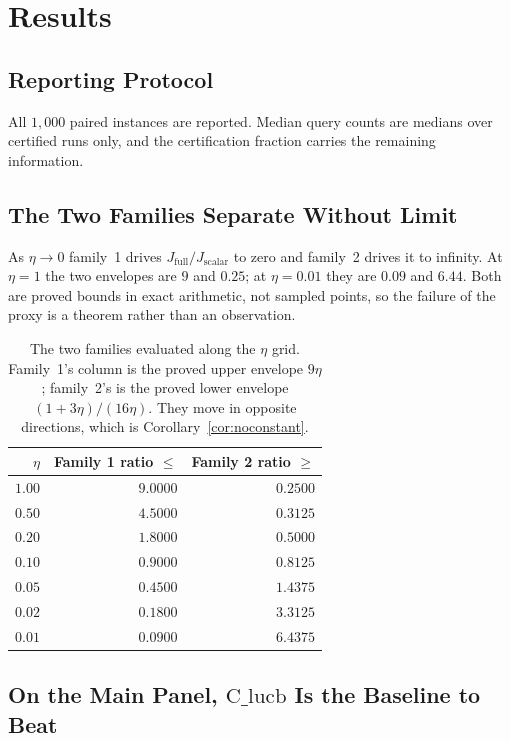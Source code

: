 \section{Results}
\label{sec:results}

\subsection{Reporting Protocol}

All $1{,}000$ paired instances are reported. Median query counts are medians over certified
runs only, and the certification fraction carries the remaining information.

\subsection{The Two Families Separate Without Limit}

As $\eta\to0$ family~1 drives $J_{\mathrm{full}}/J_{\mathrm{scalar}}$ to zero and family~2
drives it to infinity. At $\eta=1$ the two envelopes are $9$ and $0.25$; at $\eta=0.01$ they
are $0.09$ and $6.44$. Both are proved bounds in exact arithmetic, not sampled points, so the
failure of the proxy is a theorem rather than an observation.

\begin{table}[htbp]
\caption{The two families evaluated along the $\eta$ grid. Family~1's column is the proved
upper envelope $9\eta$; family~2's is the proved lower envelope $(1+3\eta)/(16\eta)$. They
move in opposite directions, which is Corollary~\ref{cor:noconstant}.}
\label{tab:families}
\centering
\footnotesize
\begin{tabular}{@{}rrr@{}}
\toprule
$\eta$ & Family 1 ratio $\le$ & Family 2 ratio $\ge$ \\
\midrule
$1.00$ & $9.0000$ & $0.2500$ \\
$0.50$ & $4.5000$ & $0.3125$ \\
$0.20$ & $1.8000$ & $0.5000$ \\
$0.10$ & $0.9000$ & $0.8125$ \\
$0.05$ & $0.4500$ & $1.4375$ \\
$0.02$ & $0.1800$ & $3.3125$ \\
$0.01$ & $0.0900$ & $6.4375$ \\
\bottomrule
\end{tabular}
\end{table}

\subsection{On the Main Panel, $\mathrm{C\_lucb}$ Is the Baseline to Beat}

